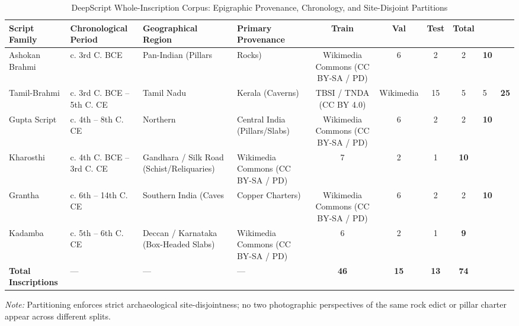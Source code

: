 \begin{table}[t]
\centering
\caption{DeepScript Whole-Inscription Corpus: Epigraphic Provenance, Chronology, and Site-Disjoint Partitions}
\label{tab:dataset_statistics}
\small
\begin{tabular}{l l l l c c c c}
\toprule
\textbf{Script Family} & \textbf{Chronological Period} & \textbf{Geographical Region} & \textbf{Primary Provenance} & \textbf{Train} & \textbf{Val} & \textbf{Test} & \textbf{Total} \\
\midrule
Ashokan Brahmi & c. 3rd C. BCE & Pan-Indian (Pillars & Rocks) & Wikimedia Commons (CC BY-SA / PD) & 6 & 2 & 2 & \textbf{10} \\
Tamil-Brahmi & c. 3rd C. BCE – 5th C. CE & Tamil Nadu & Kerala (Caverns) & TBSI / TNDA (CC BY 4.0) & Wikimedia & 15 & 5 & 5 & \textbf{25} \\
Gupta Script & c. 4th – 8th C. CE & Northern & Central India (Pillars/Slabs) & Wikimedia Commons (CC BY-SA / PD) & 6 & 2 & 2 & \textbf{10} \\
Kharosthi & c. 4th C. BCE – 3rd C. CE & Gandhara / Silk Road (Schist/Reliquaries) & Wikimedia Commons (CC BY-SA / PD) & 7 & 2 & 1 & \textbf{10} \\
Grantha & c. 6th – 14th C. CE & Southern India (Caves & Copper Charters) & Wikimedia Commons (CC BY-SA / PD) & 6 & 2 & 2 & \textbf{10} \\
Kadamba & c. 5th – 6th C. CE & Deccan / Karnataka (Box-Headed Slabs) & Wikimedia Commons (CC BY-SA / PD) & 6 & 2 & 1 & \textbf{9} \\
\midrule
\textbf{Total Inscriptions} & --- & --- & --- & \textbf{46} & \textbf{15} & \textbf{13} & \textbf{74} \\
\bottomrule
\end{tabular}
\vspace{1mm}
\begin{minipage}{\linewidth}
\footnotesize \textit{Note:} Partitioning enforces strict archaeological site-disjointness; no two photographic perspectives of the same rock edict or pillar charter appear across different splits.
\end{minipage}
\end{table}
